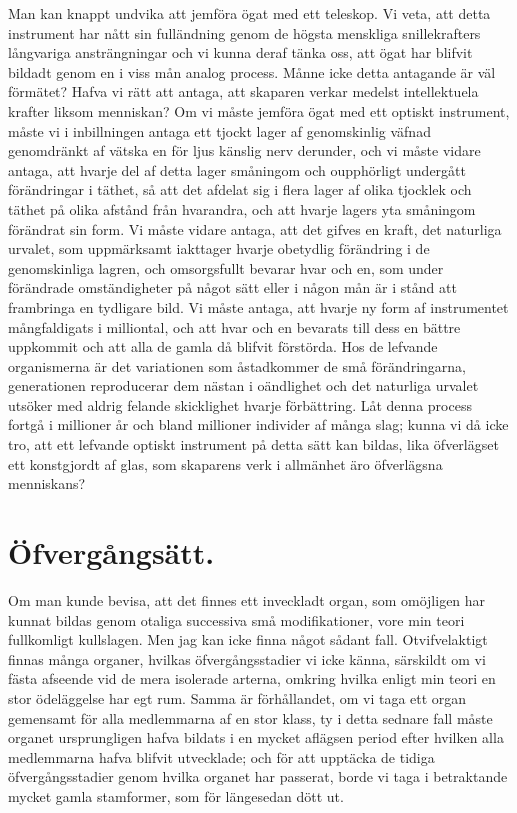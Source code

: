 Man kan knappt undvika att jemföra ögat med ett teleskop. Vi veta, att detta instrument har nått sin fulländning genom de högsta menskliga snillekrafters långvariga ansträngningar och vi kunna deraf tänka oss, att ögat har blifvit bildadt genom en i viss mån analog process. Månne icke detta antagande är väl förmätet? Hafva vi rätt att antaga, att skaparen verkar medelst intellektuela krafter liksom menniskan? Om vi måste jemföra ögat med ett optiskt instrument, måste vi i inbillningen antaga ett tjockt lager af genomskinlig väfnad genomdränkt af vätska en för ljus känslig nerv derunder, och vi måste vidare antaga, att hvarje del af detta lager småningom och oupphörligt undergått förändringar i täthet, så att det afdelat sig i flera lager af olika tjocklek och täthet på olika afstånd från hvarandra, och att hvarje lagers yta småningom förändrat sin form. Vi måste vidare antaga, att det gifves en kraft, det naturliga urvalet, som uppmärksamt iakttager hvarje obetydlig förändring i de genomskinliga lagren, och omsorgsfullt bevarar hvar och en, som under förändrade omständigheter på något sätt eller i någon mån är i stånd att frambringa en tydligare bild. Vi måste antaga, att hvarje ny form af instrumentet mångfaldigats i milliontal, och att hvar och en bevarats till dess en bättre uppkommit och att alla de gamla då blifvit förstörda. Hos de lefvande organismerna är det variationen som åstadkommer de små förändringarna, generationen reproducerar dem nästan i oändlighet och det naturliga urvalet utsöker med aldrig felande skicklighet hvarje förbättring. Låt denna process fortgå i millioner år och bland millioner individer af många slag; kunna vi då icke tro, att ett lefvande optiskt instrument på detta sätt kan bildas, lika öfverlägset ett konstgjordt af glas, som skaparens verk i allmänhet äro öfverlägsna menniskans?



\section{Öfvergångsätt.}

Om man kunde bevisa, att det finnes ett inveckladt organ, som omöjligen har kunnat bildas genom otaliga successiva små modifikationer, vore min teori fullkomligt kullslagen. Men jag kan icke finna något sådant fall. Otvifvelaktigt finnas många organer, hvilkas öfvergångsstadier vi icke känna, särskildt om vi fästa afseende vid de mera isolerade arterna, omkring hvilka enligt min teori en stor ödeläggelse har egt rum. Samma är förhållandet, om vi taga ett organ gemensamt för alla medlemmarna af en stor klass, ty i detta sednare fall måste organet ursprungligen hafva bildats i en mycket aflägsen period efter hvilken alla medlemmarna hafva blifvit utvecklade; och för att upptäcka de tidiga öfvergångsstadier genom hvilka organet har passerat, borde vi taga i betraktande mycket gamla stamformer, som för längesedan dött ut.

